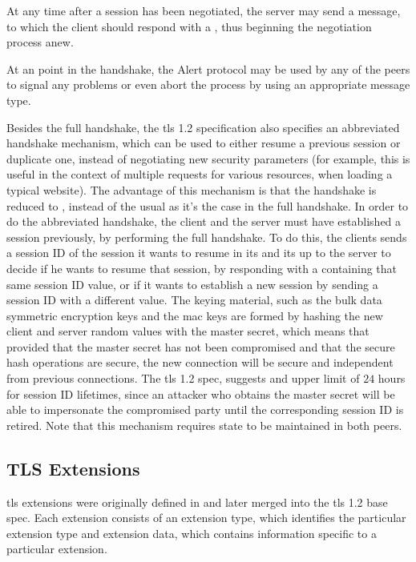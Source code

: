 \documentclass{llncs}
\begin{document}
At any time after a session has been negotiated, the server may send a 
message, to which the client should respond with a , thus
beginning the negotiation process anew.

At an point in the handshake, the Alert protocol may be used by any of the peers
to signal any problems or even abort the process by using an appropriate message type.

Besides the full handshake, the \gls{tls} 1.2 specification also specifies an
abbreviated handshake mechanism, which can be used to either resume a previous session
or duplicate one, instead of negotiating new security parameters (for example, this is useful
in the context of multiple  requests for various resources, when loading
a typical website). The advantage of this mechanism is that the handshake is reduced
to , instead of the usual  as it's the case in
the full handshake. In order to do the abbreviated handshake,
the client and the server must have established a session previously, by performing
the full handshake. To do this, the clients sends a session ID of the session it wants to
resume in its  and its up to the server to decide if he
wants to resume that session, by responding with a  containing
that same session ID value, or if it wants to establish a new session by
sending a session ID with a different value. The keying material, such as the bulk
data symmetric encryption keys and the \gls{mac} keys are formed by hashing the new client
and server random values with the master secret, which means
that provided that the master secret has not been compromised and that the secure
hash operations are secure, the new connection will be secure and independent
from previous connections. The \gls{tls} 1.2 spec, suggests and upper limit
of $24$ hours for session ID lifetimes, since an attacker who obtains the master secret
will be able to impersonate the compromised party until the corresponding session
ID is retired. Note that this mechanism requires state to be maintained in both peers.

\subsection{TLS Extensions}

\gls{tls} extensions were originally defined in \cite{RFC4366}
and later merged into the \gls{tls} 1.2 base spec. Each extension consists of an
extension type, which identifies the particular extension type and extension data,
which contains information specific to a particular extension.
\end{document}
